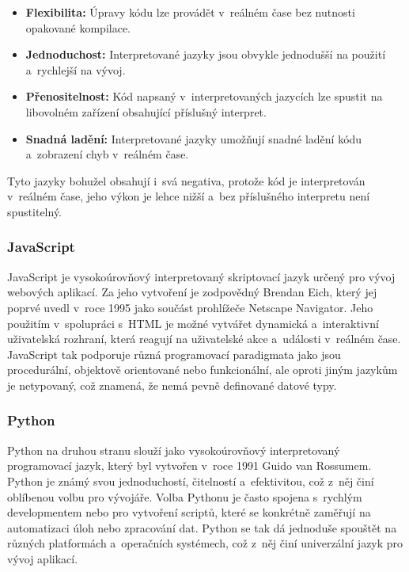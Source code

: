\begin{itemize}
    \item \textbf{Flexibilita:} Úpravy kódu lze provádět v~reálném čase bez nutnosti opakované kompilace.
    \item \textbf{Jednoduchost:} Interpretované jazyky jsou obvykle jednodušší na použití a~rychlejší na vývoj.
    \item \textbf{Přenositelnost:} Kód napsaný v~interpretovaných jazycích lze spustit na libovolném zařízení obsahující příslušný interpret.
    \item \textbf{Snadná ladění:} Interpretované jazyky umožňují snadné ladění kódu a~zobrazení chyb v~reálném čase.
\end{itemize}

Tyto jazyky bohužel obsahují i~svá negativa, protože kód je interpretován v~reálném čase, jeho výkon je lehce nižší a~bez příslušného interpretu není spustitelný.

\subsubsection*{JavaScript}
\label{subsubsec:languages-interpreted-javascript}
JavaScript je vysokoúrovňový interpretovaný skriptovací jazyk určený pro vývoj webových aplikací. Za jeho vytvoření je zodpovědný Brendan Eich, který jej poprvé uvedl v~roce 1995 jako součást prohlížeče Netscape Navigator. Jeho použitím v~spolupráci s~HTML je možné vytvářet dynamická a~interaktivní uživatelská rozhraní, která reagují na uživatelské akce a~události v~reálném čase. JavaScript tak podporuje různá programovací paradigmata jako jsou procedurální, objektově orientované nebo funkcionální, ale oproti jiným jazykům je netypovaný, což znamená, že nemá pevně definované datové typy.

\subsubsection*{Python}
\label{subsubsec:languages-interpreted-python}
Python na druhou stranu slouží jako vysokoúrovňový interpretovaný programovací jazyk, který byl vytvořen v~roce 1991 Guido van Rossumem. Python je známý svou jednoduchostí, čitelností a~efektivitou, což z~něj činí oblíbenou volbu pro vývojáře. Volba Pythonu je často spojena s~rychlým developmentem nebo pro vytvoření scriptů, které se konkrétně zaměřují na automatizaci úloh nebo zpracování dat. Python se tak dá jednoduše spouštět na různých platformách a~operačních systémech, což z~něj činí univerzální jazyk pro vývoj aplikací.

